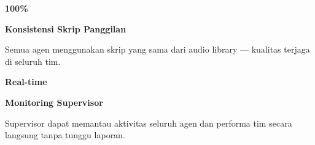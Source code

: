 \documentclass[a4paper]{article}
\begin{document}
\begin{minipage}[t]{0.485\textwidth}
    \noindent\colorbox{BlueBg}{%
        \begin{minipage}[t]{\dimexpr\linewidth-2\fboxsep}
            \vspace{6pt}
            {\fontsize{20}{24}\selectfont\bfseries\color{CrimsonPrimary} 100\%}\par\vspace{2pt}
            {\fontsize{9.5}{12}\selectfont\bfseries\color{BlueDark} Konsistensi Skrip Panggilan}\par\vspace{2pt}
            {\fontsize{8.5}{11}\selectfont\color{TextDark}Semua agen menggunakan skrip yang sama dari audio library --- kualitas terjaga di seluruh tim.}%
            \vspace{6pt}
        \end{minipage}}%
    \vspace{6pt}
    \noindent\colorbox{BlueBg}{%
        \begin{minipage}[t]{\dimexpr\linewidth-2\fboxsep}
            \vspace{6pt}
            {\fontsize{20}{24}\selectfont\bfseries\color{CrimsonPrimary} Real-time}\par\vspace{2pt}
            {\fontsize{9.5}{12}\selectfont\bfseries\color{BlueDark} Monitoring Supervisor}\par\vspace{2pt}
            {\fontsize{8.5}{11}\selectfont\color{TextDark}Supervisor dapat memantau aktivitas seluruh agen dan performa tim secara langsung tanpa tunggu laporan.}%
            \vspace{6pt}
        \end{minipage}}%
\end{minipage}

\vspace{8pt}
\end{document}
